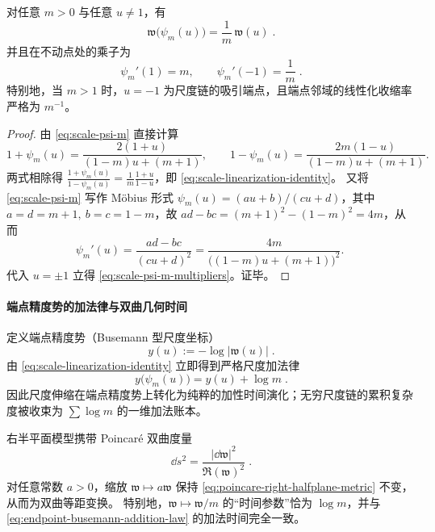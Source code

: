 \begin{proposition}[严格线性化恒等式与端点乘子]\label{prop:scale-linearization-identity-multipliers}
对任意 \(m>0\) 与任意 \(u\neq 1\)，有
\begin{equation}\label{eq:scale-linearization-identity}
\boxed{\;\mathfrak{w}\!\bigl(\psi_m(u)\bigr)=\frac{1}{m}\,\mathfrak{w}(u)\; }.
\end{equation}
并且在不动点处的乘子为
\begin{equation}\label{eq:scale-psi-m-multipliers}
\boxed{\;\psi_m'(1)=m,\qquad \psi_m'(-1)=\frac{1}{m}\; }.
\end{equation}
特别地，当 \(m>1\) 时，\(u=-1\) 为尺度链的吸引端点，且端点邻域的线性化收缩率严格为 \(m^{-1}\)。
\end{proposition}
\begin{proof}
由 \eqref{eq:scale-psi-m} 直接计算
\[
1+\psi_m(u)=\frac{2(1+u)}{(1-m)u+(m+1)},
\qquad
1-\psi_m(u)=\frac{2m(1-u)}{(1-m)u+(m+1)}.
\]
两式相除得
\(
\frac{1+\psi_m(u)}{1-\psi_m(u)}=\frac{1}{m}\frac{1+u}{1-u}
\)，即 \eqref{eq:scale-linearization-identity}。
又将 \eqref{eq:scale-psi-m} 写作 Möbius 形式 \(\psi_m(u)=(au+b)/(cu+d)\)，其中
\(
a=d=m+1,\ b=c=1-m
\)，故 \(ad-bc=(m+1)^2-(1-m)^2=4m\)，从而
\[
\psi_m'(u)=\frac{ad-bc}{(cu+d)^2}=\frac{4m}{\bigl((1-m)u+(m+1)\bigr)^2}.
\]
代入 \(u=\pm 1\) 立得 \eqref{eq:scale-psi-m-multipliers}。证毕。
\end{proof}

\paragraph{端点精度势的加法律与双曲几何时间}
定义端点精度势（Busemann 型尺度坐标）
\begin{equation}\label{eq:endpoint-busemann-potential}
\boxed{\;y(u):=-\log|\mathfrak{w}(u)|\; }.
\end{equation}
由 \eqref{eq:scale-linearization-identity} 立即得到严格尺度加法律
\begin{equation}\label{eq:endpoint-busemann-addition-law}
\boxed{\;y\!\bigl(\psi_m(u)\bigr)=y(u)+\log m\; }.
\end{equation}
因此尺度伸缩在端点精度势上转化为纯粹的加性时间演化；无穷尺度链的累积复杂度被收束为 \(\sum\log m\) 的一维加法账本。

\medskip
右半平面模型携带 Poincar{\'e} 双曲度量
\begin{equation}\label{eq:poincare-right-halfplane-metric}
\boxed{\;\dd s^{2}=\frac{|\dd \mathfrak{w}|^{2}}{\Re(\mathfrak{w})^{2}}\; }.
\end{equation}
对任意常数 \(a>0\)，缩放 \(\mathfrak{w}\mapsto a\mathfrak{w}\) 保持 \eqref{eq:poincare-right-halfplane-metric} 不变，从而为双曲等距变换。
特别地，\(\mathfrak{w}\mapsto \mathfrak{w}/m\) 的“时间参数”恰为 \(\log m\)，并与 \eqref{eq:endpoint-busemann-addition-law} 的加法时间完全一致。

